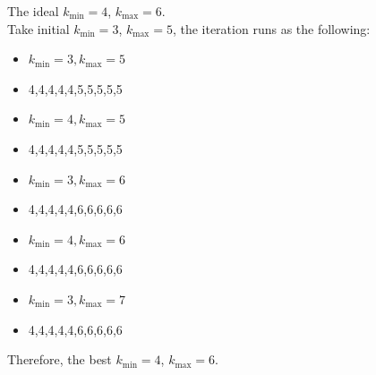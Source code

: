 \documentclass[xcolor=dvipsnames]{beamer}
\begin{document}
\begin{frame}
The ideal $k_{\min}=4$, $k_{\max}=6$.\\
Take initial $k_{\min}=3$, $k_{\max}=5$, the iteration runs as the following:\\
\begin{itemize}
\pause
\item $k_{\min}=3,k_{\max}=5$
\item 4,4,4,4,4,5,5,5,5,5\\
\pause
\item $k_{\min}=4, k_{\max}=5$\\
\item 4,4,4,4,4,5,5,5,5,5\\
\pause
\item $k_{\min}=3,k_{\max}=6$\\
\item 4,4,4,4,4,6,6,6,6,6\\
\pause
\item $k_{\min}=4,k_{\max}=6$\\
\item 4,4,4,4,4,6,6,6,6,6\\
\pause
\item $k_{\min}=3,k_{\max}=7$\\
\item 4,4,4,4,4,6,6,6,6,6\\
\pause
\end{itemize}
Therefore, the best $k_{\min}=4$, $k_{\max}=6$.\\
\end{frame}
\end{document}

